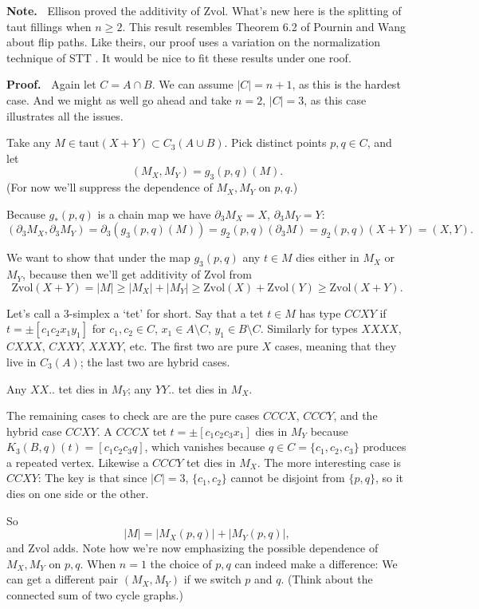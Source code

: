 \documentclass[12pt]{article}
\newcommand{\proofstart}{{\noindent \bf Proof.\ }}
\newcommand{\note}{{\noindent \bf Note.\ }}
\def\del{\partial}
\newcommand{\union}{\cup}
\newcommand{\kw}{\mathrm}
\newcommand{\taut}{\kw{taut}}
\newcommand{\Zvol}{\kw{Zvol}}
\begin{document}
\note
Ellison \cite{ellison:gap}
proved the additivity of $\Zvol$.
What's new here is the splitting of taut fillings when $n\geq 2$.
This result resembles Theorem 6.2 of
Pournin and Wang
\cite{pw:flip}
about flip paths.
Like theirs, our proof uses a variation on the normalization technique
of STT
\cite[Lemma 7]{stt:jams}.
It would be nice to fit these results under one roof.
\medskip

\proofstart
Again let $C = A \cap B$.
We can assume $|C| = n+1$,
as this is the hardest case.
And we might as well go ahead and take $n=2$, $|C|=3$,
as this case illustrates all the issues.

Take any $M \in \taut(X+Y) \subset C_3(A \union B)$.
Pick distinct points $p,q \in C$,
and let
\[
(M_X,M_Y) = g_{3}(p,q)(M)
.
\]
(For now we'll suppress the dependence of $M_X,M_Y$ on $p,q$.)

Because $g_*(p,q)$ is a chain map we have
$\del_{3} M_X = X$, $\del_{3} M_Y = Y$:
\[
(\del_{3} M_X, \del_{3} M_Y)
=
\del_{3} (g_{3}(p,q)(M))
=
g_2(p, q)(\del_{3} M)
=
g_2(p,q)(X+Y)
=
(X,Y)
.
\]

We want to show that under the map $g_3(p,q)$ any $t \in M$
dies either in $M_X$ or $M_Y$,
because then we'll get additivity of $\Zvol$ from
\[
\Zvol(X+Y) = |M|
\geq |M_X| + |M_Y|
\geq \Zvol(X) + \Zvol(Y)
\geq \Zvol(X+Y)
.
\]

Let's call a $3$-simplex a `tet' for short.
Say that a tet $t \in M$ has type $CCXY$ if $t= \pm[c_1c_2x_1y_1]$
for $c_1,c_2 \in C$, $x_1 \in A \setminus C$, $y_1 \in B \setminus C$.
Similarly for types $XXXX$, $CXXX$, $CXXY$, $XXXY$, etc.
The first two are pure $X$ cases, meaning that they live in $C_3(A)$;
the last two are hybrid cases.

Any $XX..$ tet dies in $M_Y$;
any $YY..$ tet dies in $M_X$.

The remaining cases to check are
are the pure cases $CCCX$, $CCCY$,
and the hybrid case $CCXY$.
A $CCCX$ tet $t=\pm[c_1c_2c_3x_1]$ dies in $M_Y$ because
$K_3(B,q)(t)=[c_1c_2c_3q]$,
which vanishes because $q \in C = \{c_1,c_2,c_3\}$ produces a repeated vertex.
Likewise a $CCCY$ tet dies in $M_X$.
The more interesting case is $CCXY$:
The key is that since $|C|=3$, $\{c_1,c_2\}$ cannot be disjoint from $\{p,q\}$,
so it dies on one side or the other.

So 
\[
|M| = |M_X(p,q)| + |M_Y(p,q)|,
\]
and $\Zvol$ adds.
Note how we're now emphasizing the possible dependence of $M_X,M_Y$ on $p,q$.
When $n=1$ the choice of $p,q$ can indeed make a difference:
We can get a different pair $(M_X,M_Y)$ if we switch
$p$ and $q$.
(Think about the connected sum of two cycle graphs.)
\end{document}
